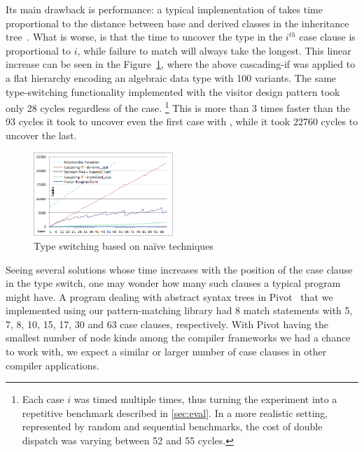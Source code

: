 \noindent
Its main drawback is performance: a typical 
implementation of  takes time proportional to the 
distance between base and derived classes in the inheritance tree~\cite{XXXXX}.
What is worse, is that the time to uncover the type in the $i^{th}$ case clause 
is proportional to $i$, while failure to match will always take the longest. 
This linear increase can be seen in the Figure~\ref{fig:DCastVis1}, where 
the above cascading-if was applied to a flat hierarchy encoding an algebraic 
data type with 100 variants. The same type-switching functionality implemented 
with the visitor design pattern took only 28 cycles regardless of the case.
\footnote{Each case $i$ was timed multiple times, thus turning the experiment 
into a repetitive benchmark described in \textsection\ref{sec:eval}. In a more
realistic setting, represented by random and sequential benchmarks, the cost of 
double dispatch was varying between 52 and 55 cycles.}
This is more than 3 times faster than the 93 cycles it took to uncover even the 
first case with , while it took 22760 cycles to uncover the 
last.

\begin{figure}[htbp]
  \centering
    \includegraphics[width=0.47\textwidth]{DCast-vs-Visitors1.png}
  \caption{Type switching based on na\"ive techniques}
  \label{fig:DCastVis1}
\end{figure}

Seeing several solutions whose time increases with the position of the case 
clause in the type switch, one may wonder how many such clauses a typical 
program might have. A program dealing with abstract syntax trees in 
Pivot~\cite{Pivot09} that we implemented using our pattern-matching library had 
8 match statements with 5, 7, 8, 10, 15, 17, 30 and 63 case clauses, 
respectively. With Pivot having the smallest number of node kinds among the 
compiler frameworks we had a chance to work with, we expect a similar or larger 
number of case clauses in other compiler applications.

